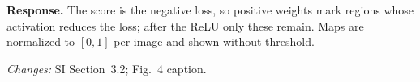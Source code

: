 \textbf{Response.} The score is the negative loss, so positive weights mark regions whose activation reduces the loss; after the ReLU only these remain. Maps are normalized to $[0, 1]$ per image and shown without threshold.

\textit{Changes:} SI Section~3.2; Fig.~4 caption.
